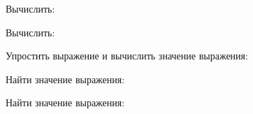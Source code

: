 \begin{listofex}
	\item Вычислить: %
	\begin{enumcols}[itemcolumns=2]
		\item {}
		\item {}
		\item {}
	\end{enumcols}
	\item Вычислить: %
	\begin{enumcols}[itemcolumns=3]
		\item {}
		\item {}
		\item {}
	\end{enumcols}
	\item Упростить выражение и вычислить значение выражения: %
	\begin{enumcols}[itemcolumns=2]
		\item {}
		\item {}
	\end{enumcols}
	\begin{enumcols}[itemcolumns=1, start=3]
		\item {}
		\item {}
	\end{enumcols}
	\item Найти значение выражения: %
	\begin{enumcols}[itemcolumns=2]
		\item {}
		\item {}
	\end{enumcols}
	\begin{enumcols}[itemcolumns=1, start=3]
		\item \vspace{-0,5em}
		\item {}
	\end{enumcols}
	\item Найти значение выражения: %
	\begin{enumcols}[itemcolumns=1]
		\item {}
		\item {}\vspace{0,5em}
	\end{enumcols}
	\begin{enumcols}[itemcolumns=2, start=3]

\end{enumcols}
\end{listofex}

